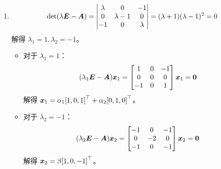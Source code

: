 \begin{problem}
\begin{solution}
\begin{enumerate}
\begin{itemize}
				\item 对于 $\lambda_2 = -2$：
				$$
				(\lambda_2 \matr{E} - \matr{A}) \vect{x}_2 = \begin{bmatrix}
					-3 & -1 & -1 & -1 \\
					-1 & -3 & 1 & 1 \\
					-1 & 1 & -3 & 1 \\
					-1 & 1 & 1 & -3
				\end{bmatrix} \vect{x}_2 = \vect{0}
				$$
				解得 $\vect{x}_2 = \beta \transpose{[-1, 1, 1, 1]}$。
			\end{itemize}

			\item[\textbf{5)}]
			$$
			\det(\lambda \boldsymbol{E} - \boldsymbol{A}) = \begin{vmatrix}
				\lambda & 0 & -1 \\
				0 & \lambda - 1 & 0 \\
				-1 & 0 & \lambda
			\end{vmatrix} = (\lambda + 1)(\lambda - 1)^2 = 0
			$$
			解得 $\lambda_1 = 1, \lambda_2 = -1$。

			\begin{itemize}
				\item 对于 $\lambda_1 = 1$：
				$$
				(\lambda_1 \boldsymbol{E} - \boldsymbol{A}) \boldsymbol{x}_1 = \begin{bmatrix}
					1 & 0 & -1 \\
					0 & 0 & 0 \\
					-1 & 0 & 1
				\end{bmatrix} \boldsymbol{x}_1 = \boldsymbol{0}
				$$
				解得 $\boldsymbol{x}_1 = \alpha_1 {[1, 0, 1]}^\top + \alpha_2 {[0, 1, 0]}^\top$。

				\item 对于 $\lambda_2 = -1$：
				$$
				(\lambda_2 \boldsymbol{E} - \boldsymbol{A}) \boldsymbol{x}_2 = \begin{bmatrix}
					-1 & 0 & -1 \\
					0 & -2 & 0 \\
					-1 & 0 & -1
				\end{bmatrix} \boldsymbol{x}_2 = \boldsymbol{0}
				$$
				解得 $\boldsymbol{x}_2 = \beta {[1, 0, -1]}^\top$。
			\end{itemize}
		\end{enumerate}
	\end{solution}
\end{problem}

